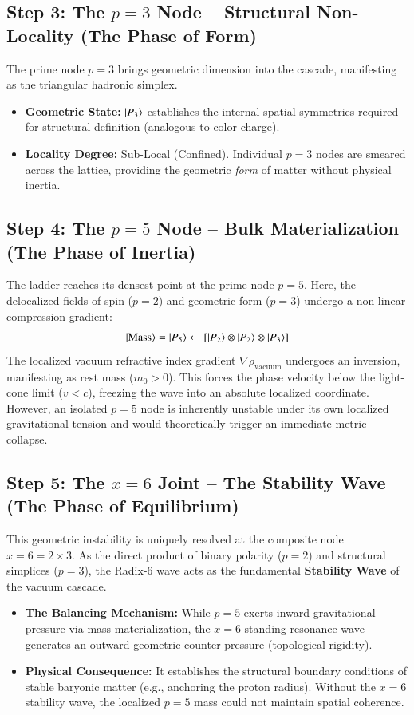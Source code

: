 \documentclass[twocolumn]{aa}
\begin{document}
\subsection{Step 3: The $p=3$ Node – Structural Non-Locality (The Phase of Form)}
The prime node $p=3$ brings geometric dimension into the cascade, manifesting as the triangular hadronic simplex.
\begin{itemize}
    \item \textbf{Geometric State:} $\ket{P_3}$ establishes the internal spatial symmetries required for structural definition (analogous to color charge).
    \item \textbf{Locality Degree:} Sub-Local (Confined). Individual $p=3$ nodes are smeared across the lattice, providing the geometric \textit{form} of matter without physical inertia.
\end{itemize}

\subsection{Step 4: The $p=5$ Node – Bulk Materialization (The Phase of Inertia)}
The ladder reaches its densest point at the prime node $p=5$. Here, the delocalized fields of spin ($p=2$) and geometric form ($p=3$) undergo a non-linear compression gradient:
\begin{equation}
\ket{\text{Mass}} = \ket{P_5} \leftarrow \left[ \ket{P_2} \otimes \ket{P_2} \otimes \ket{P_3} \right]
\end{equation}
The localized vacuum refractive index gradient $\nabla\rho_{\text{vacuum}}$ undergoes an inversion, manifesting as rest mass ($m_0 > 0$). This forces the phase velocity below the light-cone limit ($v < c$), freezing the wave into an absolute localized coordinate. However, an isolated $p=5$ node is inherently unstable under its own localized gravitational tension and would theoretically trigger an immediate metric collapse.

\subsection{Step 5: The $x=6$ Joint – The Stability Wave (The Phase of Equilibrium)}
This geometric instability is uniquely resolved at the composite node $x = 6 = 2 \times 3$. As the direct product of binary polarity ($p=2$) and structural simplices ($p=3$), the Radix-6 wave acts as the fundamental \textbf{Stability Wave} of the vacuum cascade.
\begin{itemize}
    \item \textbf{The Balancing Mechanism:} While $p=5$ exerts inward gravitational pressure via mass materialization, the $x=6$ standing resonance wave generates an outward geometric counter-pressure (topological rigidity). 
    \item \textbf{Physical Consequence:} It establishes the structural boundary conditions of stable baryonic matter (e.g., anchoring the proton radius). Without the $x=6$ stability wave, the localized $p=5$ mass could not maintain spatial coherence.
\end{itemize}
\end{document}

